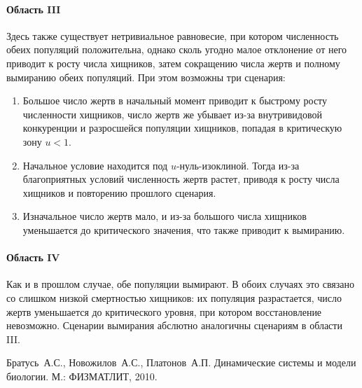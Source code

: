 \documentclass[16pt]{article}
\begin{document}
\paragraph{Область III} Здесь также существует нетривиальное равновесие, при котором численность обеих популяций
положительна, однако сколь угодно малое отклонение от него приводит к росту числа хищников, затем сокращению
числа жертв и полному вымиранию обеих популяций. При этом возможны три сценария:
\begin{enumerate}
\item Большое число жертв в начальный момент приводит к быстрому росту численности хищников, число жертв же
убывает из-за внутривидовой конкуренции и разросшейся популяции хищников, попадая в критическую зону $u < 1$.
\item Начальное условие находится под $u$-нуль-изоклиной. Тогда из-за благоприятных условий численность
жертв растет, приводя к росту числа хищников и повторению прошлого сценария.
\item Изначальное число жертв мало, и из-за большого числа хищников уменьшается до критического значения, что
также приводит к вымиранию.
\end{enumerate}

\paragraph{Область IV} Как и в прошлом случае, обе популяции вымирают. В обоих случаях это связано со слишком
низкой смертностью хищников: их популяция разрастается, число жертв уменьшается до критического уровня, 
при котором восстановление невозможно. Сценарии вымирания абслютно аналогичны сценариям в области III.

\newpage
\begin{thebibliography}{0}
	Братусь~А.С., Новожилов~А.С., Платонов~А.П. Динамические системы и модели биологии. М.: ФИЗМАТЛИТ, 2010. 
\end{thebibliography}
\end{document}
